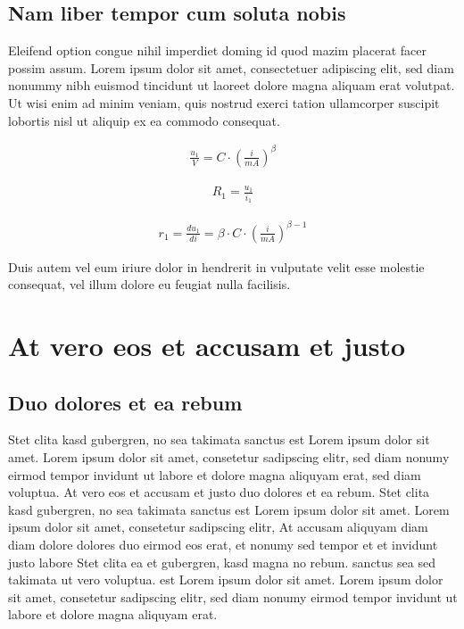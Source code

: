 \documentclass[
    a4paper,             %
    12pt,                %
    headheight=34pt,     %
    parskip,             %
    bibliography=totoc,  %
    index=totoc,         %
    listof=totoc,        %
    ]{scrartcl}          %
\begin{document}
        \subsection{Nam liber tempor cum soluta nobis}
            Eleifend option congue nihil imperdiet doming id quod mazim placerat facer possim assum. Lorem ipsum dolor sit amet, consectetuer adipiscing elit, sed diam nonummy nibh euismod tincidunt ut laoreet dolore magna aliquam erat volutpat. Ut wisi enim ad minim veniam, quis nostrud exerci tation ullamcorper suscipit lobortis nisl ut aliquip ex ea commodo consequat.   
            
            \begin{align}
                \frac{u_1}{V}=C\cdot \left( \frac{i}{mA}\right)^\beta 
                \label{formel:1}
            \end{align}
            
            
            \begin{align}
                R_1=\frac{u_1}{i_1}
                \label{formel:2}
            \end{align}
            
            
            \begin{align}
                r_1=\frac{du_1}{di}=\beta\cdot C\cdot\left( \frac{i}{mA}\right) ^{\beta -1}
                \label{formel:3}
            \end{align} 
            
            Duis autem vel eum iriure dolor in hendrerit in vulputate velit esse molestie consequat, vel illum dolore eu feugiat nulla facilisis.   
            
            
    \section{At vero eos et accusam et justo}
        \subsection{Duo dolores et ea rebum}
            Stet clita kasd gubergren, no sea takimata sanctus est Lorem ipsum dolor sit amet. Lorem ipsum dolor sit amet, consetetur sadipscing elitr, sed diam nonumy eirmod tempor invidunt ut labore et dolore magna aliquyam erat, sed diam voluptua. At vero eos et accusam et justo duo dolores et ea rebum. Stet clita kasd gubergren, no sea takimata sanctus est Lorem ipsum dolor sit amet. Lorem ipsum dolor sit amet, consetetur sadipscing elitr, At accusam aliquyam diam diam dolore dolores duo eirmod eos erat, et nonumy sed tempor et et invidunt justo labore Stet clita ea et gubergren, kasd magna no rebum. sanctus sea sed takimata ut vero voluptua. est Lorem ipsum dolor sit amet. Lorem ipsum dolor sit amet, consetetur sadipscing elitr, sed diam nonumy eirmod tempor invidunt ut labore et dolore magna aliquyam erat.   
\end{document}

